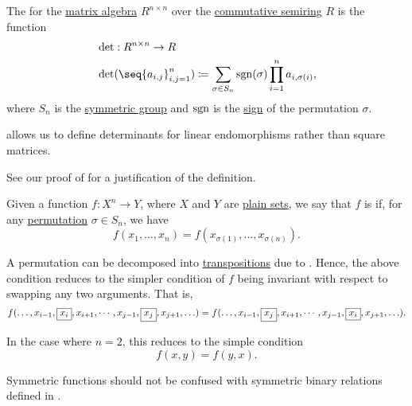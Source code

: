 \begin{definition}\label{def:matrix_determinant}
  The  for the \hyperref[thm:matrix_algebra]{matrix algebra} \( R^{n \times n} \) over the \hyperref[def:semiring/commutative]{commutative semiring} \( R \) is the function
  \begin{equation}\label{eq:def:matrix_determinant}
    \begin{aligned}
      &\det: R^{n \times n} \to R \\
      &\det(\seq{ a_{i,j} }_{i,j=1}^n) \coloneqq \sum_{\sigma \in S_n} \sgn(\sigma) \prod_{i=1}^n a_{i,\sigma(i)},
    \end{aligned}
  \end{equation}
  where \( S_n \) is the \hyperref[def:symmetric_group]{symmetric group} and \( \operatorname{sgn} \) is the \hyperref[def:permutation_parity]{sign} of the permutation \( \sigma \).

   allows us to define determinants for linear endomorphisms rather than square matrices.

  See our proof of  for a justification of the definition.
\end{definition}

\begin{definition}\label{def:symmetric_function}\mimprovised
  Given a function \( f: X^n \to Y \), where \( X \) and \( Y \) are \hyperref[def:set]{plain sets}, we say that \( f \) is  if, for any \hyperref[def:symmetric_group/permutation]{permutation} \( \sigma \in S_n \), we have
  \begin{equation*}
    f(x_1, \ldots, x_n) = f(x_{\sigma(1)}, \ldots, x_{\sigma(n)}).
  \end{equation*}

  A permutation can be decomposed into \hyperref[def:symmetric_group/cycle]{transpositions} due to . Hence, the above condition reduces to the simpler condition of \( f \) being invariant with respect to swapping any two arguments. That is,
  \begin{equation*}
    f(\ldots, x_{i-1}, \fbox{\( x_i \)}, x_{i+1}, \cdots, x_{j-1}, \fbox{\( x_j \)}, x_{j+1}, \ldots)
    =
    f(\ldots, x_{i-1}, \fbox{\( x_j \)}, x_{i+1}, \cdots, x_{j-1}, \fbox{\( x_i \)}, x_{j+1}, \ldots).
  \end{equation*}

  In the case where \( n = 2 \), this reduces to the simple condition
  \begin{equation*}
    f(x, y) = f(y, x).
  \end{equation*}

  Symmetric functions should not be confused with symmetric binary relations defined in .
\end{definition}

